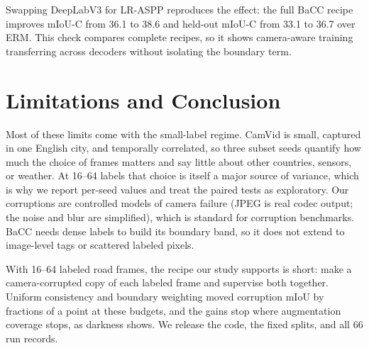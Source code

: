 \documentclass[runningheads]{llncs}
\newcommand{\method}{BaCC}
\newcommand{\miouc}{mIoU-C}
\begin{document}
Swapping DeepLabV3 for LR-ASPP reproduces the effect: the full \method{} recipe
improves \miouc{} from 36.1 to 38.6 and held-out \miouc{} from 33.1 to 36.7
over ERM. This check compares complete recipes, so it shows camera-aware
training transferring across decoders without isolating the boundary term.

\section{Limitations and Conclusion}

Most of these limits come with the small-label regime. CamVid is small, captured in one English city, and temporally
correlated, so three subset seeds quantify how much the choice of frames
matters and say little about other countries, sensors, or weather. At 16--64
labels that choice is itself a major source of variance, which is why we
report per-seed values and treat the paired tests as exploratory. Our
corruptions are controlled models of camera failure (JPEG is real codec
output; the noise and blur are simplified), which is standard for corruption
benchmarks. \method{} needs dense labels to build its boundary band, so it does not
extend to image-level tags or scattered labeled pixels.

With 16--64 labeled road frames, the recipe our study supports is short: make
a camera-corrupted copy of each labeled frame and supervise both together.
Uniform consistency and boundary weighting moved corruption mIoU by fractions
of a point at these budgets, and the gains stop where augmentation coverage
stops, as darkness shows. We release the
code, the fixed splits, and all 66 run records.



\end{document}
